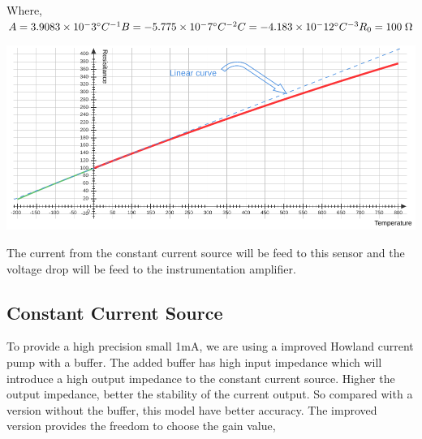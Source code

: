 \begin{multicols}{2}
Where,\\
$ A        = 3.9083 \times 10^-3 ^\circ C^{-1} \\
B        = -5.775 \times 10^-7 ^\circ C^{-2} \\
C        = -4.183 \times 10^-12 ^\circ C^{-3} \\
R_0 = 100\; \Omega$

\begin{minipage}{0.45\textwidth}
\centering
\includegraphics[width=\textwidth]{Method/pt100 curve.pdf}
\end{minipage}

The current from the constant current source will be feed to this sensor and the voltage drop will be feed to the instrumentation amplifier.

\subsection{Constant Current Source}

To provide a high precision small 1mA, we are using a improved Howland current pump with a buffer. The added buffer has high input impedance which will introduce a high output impedance to the constant current source. Higher the output impedance, better the stability of the current output. So compared with a version without the buffer, this model have better accuracy. The improved version provides the freedom to choose the gain value,


\end{multicols}

